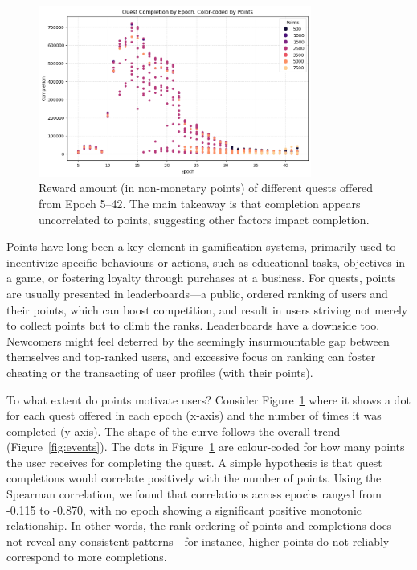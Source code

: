 \begin{figure}[t]
    \centering
    \includegraphics[width=0.8\textwidth]{figures/points.png}
    \caption{Reward amount (in non-monetary points) of different quests offered from Epoch 5--42. The main takeaway is that completion appears uncorrelated to points, suggesting other factors impact completion.\label{fig:points}}
\end{figure}

Points have long been a key element in gamification systems, primarily used to incentivize specific behaviours or actions, such as educational tasks, objectives in a game, or fostering loyalty through purchases at a business. For quests, points are usually presented in leaderboards---a public, ordered ranking of users and their points, which can boost competition, and result in users striving not merely to collect points but to climb the ranks. Leaderboards have a downside too. Newcomers might feel deterred by the seemingly insurmountable gap between themselves and top-ranked users, and excessive focus on ranking can foster cheating or the transacting of user profiles (with their points).

To what extent do points motivate users? Consider Figure~\ref{fig:points} where it shows a dot for each quest offered in each epoch (x-axis) and the number of times it was completed (y-axis). The shape of the curve follows the overall trend (Figure~\ref{fig:events}). The dots in Figure~\ref{fig:points} are colour-coded for how many points the user receives for completing the quest. A simple hypothesis is that quest completions would correlate positively with the number of points. Using the Spearman correlation, we found that correlations across epochs ranged from -0.115 to -0.870, with no epoch showing a significant positive monotonic relationship. In other words, the rank ordering of points and completions does not reveal any consistent patterns—for instance, higher points do not reliably correspond to more completions.

